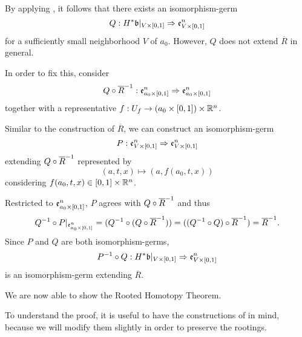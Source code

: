 \begin{myproof} By applying , it follows that there exists an isomorphism-germ \[ \germdef{Q}{\ind{H}\bb[\cyl{V}]}{\be{\cyl{V}}} \] for a sufficiently small neighborhood $V$ of $a_0$. However, $Q$ does not extend $\overline{R}$ in general.

In order to fix this, consider \[ Q \circ \overline{R}^{-1}: \mathfrak{e}^{n}_{a_0 \times{} [0, 1]} \Rightarrow{} \mathfrak{e}^{n}_{a_0 \times{} [0, 1]} \] together with a representative $f: U_f \to (a_0 \times{} [0, 1]) \times \mathbb{R}^n$.

Similar to the construction of $\overline{R}$, we can construct an isomorphism-germ \[ P: \mathfrak{e}^{n}_{V \times{} [0, 1]} \Rightarrow{} \mathfrak{e}^{n}_{V \times{} [0, 1]} \] extending $Q \circ \overline{R}^{-1}$ represented by \[ (a, t, x) \mapsto (a, f(a_0, t, x)) \] considering $f(a_0, t, x) \in [0, 1] \times \mathbb{R}^n$.

Restricted to $\mathfrak{e}^{n}_{a_0 \times{} [0, 1]}$, $P$ agrees with $Q \circ \overline{R}^{-1}$ and thus \[ Q^{-1} \circ P\vert_{\mathfrak{e}^{n}_{a_0 \times{} [0, 1]}} = (Q^{-1} \circ (Q \circ \overline{R}^{-1})) = ((Q^{-1} \circ Q) \circ \overline{R}^{-1}) = \overline{R}^{-1}. \] Since $P$ and $Q$ are both isomorphism-germs, \[ \germdef{\inv{P} \circ Q}{\ind{H}\bb[\cyl{V}]}{\be{\cyl{V}}} \] is an isomorphism-germ extending $\overline{R}$. \end{myproof}

\begin{myparagraph} We are now able to show the Rooted Homotopy Theorem.

To understand the proof, it is useful to have the constructions of  in mind, because we will modify them slightly in order to preserve the rootings. \end{myparagraph}

